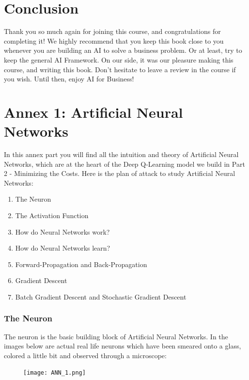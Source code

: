 \documentclass[]{book}
\begin{document}
\hypertarget{conclusion}{%
\chapter{Conclusion}\label{conclusion}}

Thank you so much again for joining this course, and congratulations for completing it! We highly recommend that you keep this book close to you whenever you are building an AI to solve a business problem. Or at least, try to keep the general AI Framework. On our side, it was our pleasure making this course, and writing this book. Don't hesitate to leave a review in the course if you wish. Until then, enjoy AI for Business!

\hypertarget{annex-1-artificial-neural-networks}{%
\chapter{Annex 1: Artificial Neural Networks}\label{annex-1-artificial-neural-networks}}

In this annex part you will find all the intuition and theory of Artificial Neural Networks, which are at the heart of the Deep Q-Learning model we build in Part 2 - Minimizing the Costs. Here is the plan of attack to study Artificial Neural Networks:

\begin{enumerate}
    \item The Neuron
    \item The Activation Function
    \item How do Neural Networks work?
    \item How do Neural Networks learn?
    \item Forward-Propagation and Back-Propagation
    \item Gradient Descent
    \item Batch Gradient Descent and Stochastic Gradient Descent
\end{enumerate}

\subsection{The Neuron}

The neuron is the basic building block of Artificial Neural Networks. In the images below are actual real life neurons which have been smeared onto a glass, colored a little bit and observed through a microscope:

\begin{figure}[!htbp]
        \begin{center}
            \texttt{[image: ANN\_1.png]}
        \end{center}
\end{figure}
\end{document}
